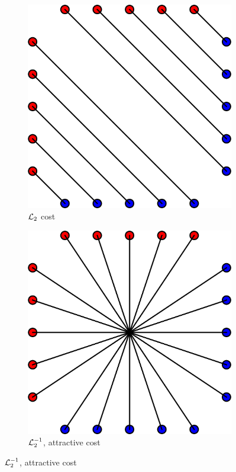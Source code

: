 \begin{figure}
    \centering
    \begin{subfigure}[c]{.5\textwidth}
        \centering
        \includegraphics[width=\textwidth]{samples/1/l2_coupling.png}
        \caption{$\mathcal{L}_2$ cost}
    \end{subfigure}
    
    \begin{subfigure}[c]{.5\textwidth}
        \centering
        \includegraphics[width=\textwidth]{samples/1/l2_attract_coupling.png}
        \caption{$\mathcal{L}_2^{-1}$, attractive cost}
    \end{subfigure}
    

\end{figure}
